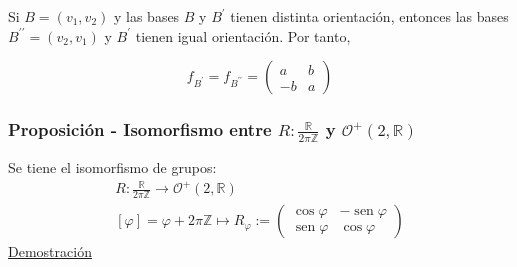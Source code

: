 \documentclass[12pt, a4paper, ones, notitlepage, openany,titlepage]{article}
\newcommand{\demostracion}{\noindent\underline{Demostración}}
\begin{document}
Si $B=\left(v_{1}, v_{2}\right)$ y las bases $B$ y $B^{\prime}$ tienen distinta orientación, entonces las bases $B^{\prime \prime}=\left(v_{2}, v_{1}\right)$ y $B^{\prime}$ tienen igual orientación. Por tanto,

$$
f_{B^{\prime}}=f_{B^{\prime \prime}}=\left(\begin{array}{rr}
	a & b \\
	-b & a
\end{array}\right)
$$

\subsubsection{Proposición - Isomorfismo entre $\displaystyle R: \frac{\mathbb{R}}{2 \pi \mathbb{Z}}$ y $\mathcal{O}^{+}(2, \mathbb{R})$}
\noindent Se tiene el isomorfismo de grupos:
$$
\begin{gathered}
	R: \frac{\mathbb{R}}{2 \pi \mathbb{Z}} \longrightarrow \mathcal{O}^{+}(2, \mathbb{R}) \\
	[\varphi] = \varphi+2 \pi \mathbb{Z} \longmapsto R_{\varphi} := \begin{pmatrix}
		\operatorname{cos}\varphi & -\operatorname{sen}\varphi \\
		\operatorname{sen}\varphi & \operatorname{cos}\varphi
	\end{pmatrix}
\end{gathered}
$$
\demostracion
\end{document}
